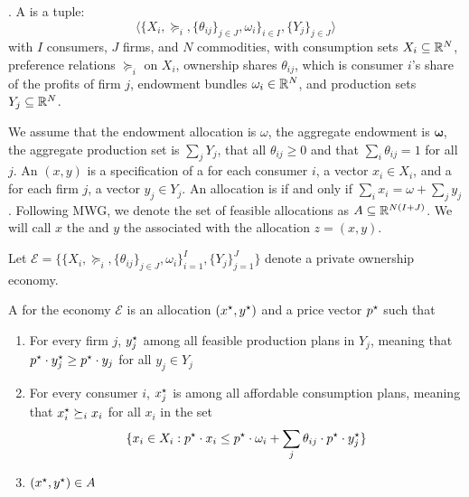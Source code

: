 \documentclass[10pt]{article}
\begin{document}
\begin{model}
	. A  is a tuple:\[\langle \{X_i,\succeq_i,\{\theta_{ij}\}_{j\in J},\omega_i\}_{i \in I},\{Y_j\}_{j \in J}\rangle\]with $I$ consumers, $J$ firms, and $N$ commodities, with consumption sets $X_i \subseteq \mathbb{R}^N$, preference relations $\succeq_i$ on $X_i$, ownership shares $\theta_{ij}$, which is consumer $i$'s share of the profits of firm $j$, endowment bundles $\omega_i \in \mathbb{R}^N$, and production sets $Y_j \subseteq \mathbb{R}^N$. 
	
	We assume that the endowment allocation is $\omega$, the aggregate endowment is $\bm{\omega}$, the aggregate production set is $\sum_j Y_j$, that all $\theta_{ij} \ge 0$ and that $\sum_i \theta_{ij} = 1$ for all $j$. An  $(x,y)$ is a specification of a  for each consumer $i$, a vector $x_i \in X_i$, and a  for each firm $j$, a vector $y_j \in Y_j$. An allocation is  if and only if $\sum_i x_i = \omega + \sum_j y_j$. Following MWG, we denote the set of feasible allocations as $A \subseteq \mathbb{R}^{N(I+J)}$. We will call $x$ the  and $y$ the  associated with the allocation $z = (x,y)$.
	
	Let $\mathcal{E} = \{\{X_i,\succeq_i,\{\theta_{ij}\}_{j\in J},\omega_i\}_{i=1}^I,\{Y_j\}_{j=1}^J\}$ denote a private ownership economy.
	
	\begin{definition}
		A  for the economy $\mathcal{E}$ is an allocation $(x^\star,y^\star)$ and a price vector $p^\star$ such that 
		\begin{enumerate}
			\item For every firm $j$, $y^\star_j$  among all feasible production plans in $Y_j$, meaning that $p^\star \cdot y^\star_j \ge p^\star \cdot y_j$ for all $y_j \in Y_j$
			\item For every consumer $i$, $x^\star_j$ is  among  all affordable consumption plans, meaning that $x_i^\star \succeq_i x_i$ for all $x_i$ in the set \[\{x_i \in X_i : p^\star \cdot x_i \le p^\star \cdot \omega_i  + \sum_{j} \theta_{ij} \cdot p^\star \cdot y_j^\star\}\]
			\item $(x^\star,y^\star) \in A$
		\end{enumerate}
	\end{definition}
	

\end{model}
\end{document}
